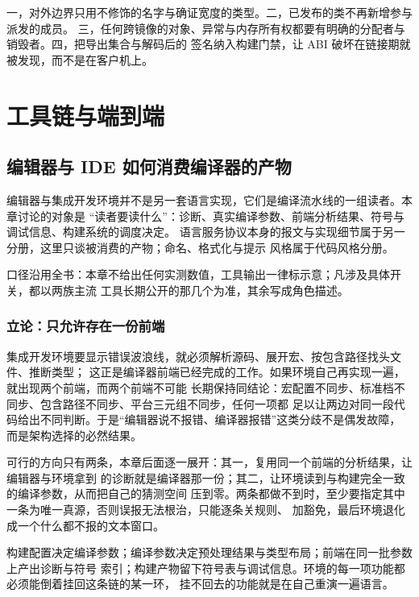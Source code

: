 \documentclass[12pt,a4paper,fontset=fandol]{ctexbook}
\begin{document}
\begin{guideline}[title={本章的四条可执行纪律}]
一，对外边界只用不修饰的名字与确证宽度的类型。二，已发布的类不再新增参与派发的成员。
三，任何跨镜像的对象、异常与内存所有权都要有明确的分配者与销毁者。四，把导出集合与解码后的
签名纳入构建门禁，让 ABI 破坏在链接期就被发现，而不是在客户机上。
\end{guideline}

\part{工具链与端到端}
\chapter{编辑器与 IDE 如何消费编译器的产物}\label{ch:cl14-ide}

编辑器与集成开发环境并不是另一套语言实现，它们是编译流水线的一组读者。本章讨论的对象是
“读者要读什么”：诊断、真实编译参数、前端分析结果、符号与调试信息、构建系统的调度决定。
语言服务协议本身的报文与实现细节属于另一分册，这里只谈被消费的产物；命名、格式化与提示
风格属于代码风格分册。

口径沿用全书：本章不给出任何实测数值，工具输出一律标示意；凡涉及具体开关，都以两族主流
工具长期公开的那几个为准，其余写成角色描述。

\section{立论：只允许存在一份前端}\label{sec:cl14-one-frontend}

集成开发环境要显示错误波浪线，就必须解析源码、展开宏、按包含路径找头文件、推断类型；
这正是编译器前端已经完成的工作。如果环境自己再实现一遍，就出现两个前端，而两个前端不可能
长期保持同结论：宏配置不同步、标准档不同步、包含路径不同步、平台三元组不同步，任何一项都
足以让两边对同一段代码给出不同判断。于是“编辑器说不报错、编译器报错”这类分歧不是偶发故障，
而是架构选择的必然结果。

可行的方向只有两条，本章后面逐一展开：其一，复用同一个前端的分析结果，让编辑器与环境拿到
的诊断就是编译器那一份；其二，让环境读到与构建完全一致的编译参数，从而把自己的猜测空间
压到零。两条都做不到时，至少要指定其中一条为唯一真源，否则误报无法根治，只能逐条关规则、
加豁免，最后环境退化成一个什么都不报的文本窗口。

\begin{flow}[title={编辑期消费的产物链}]
构建配置决定编译参数；编译参数决定预处理结果与类型布局；前端在同一批参数上产出诊断与符号
索引；构建产物留下符号表与调试信息。环境的每一项功能都必须能倒着挂回这条链的某一环，
挂不回去的功能就是在自己重演一遍语言。
\end{flow}
\end{document}
